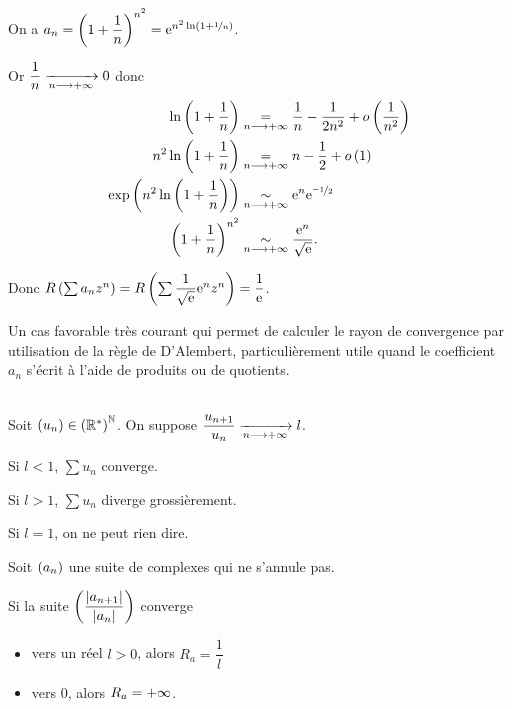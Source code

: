 \begin{corr}~\\
On a \(a_n=\left(1+\dfrac{1}{n}\right)^{n^2}=\mathrm{e}^{n^2\ln\left(1+\nicefrac{1}{n}\right)}\).

Or \(\dfrac{1}{n}\xrightarrow[n\longrightarrow+\infty]{}0\) donc \[\begin{aligned}
\ln\left(1+\dfrac{1}{n}\right)&\underset{n\longrightarrow+\infty}{=}\dfrac{1}{n}-\dfrac{1}{2n^2}+o\left(\dfrac{1}{n^2}\right) \\
n^2\ln\left(1+\dfrac{1}{n}\right)&\underset{n\longrightarrow+\infty}{=}n-\dfrac{1}{2}+o\left(1\right) \\
\exp\left(n^2\ln\left(1+\dfrac{1}{n}\right)\right)&\underset{n\longrightarrow+\infty}{\sim}\mathrm{e}^{n}\mathrm{e}^{\nicefrac{-1}{2}} \\
\left(1+\dfrac{1}{n}\right)^{n^2}&\underset{n\longrightarrow+\infty}{\sim}\dfrac{\mathrm{e}^{n}}{\sqrt{\mathrm{e}^{}}}.
\end{aligned}\]

Donc \(R\left(\sum a_nz^n\right)=R\left(\sum\dfrac{1}{\sqrt{\mathrm{e}^{}}}\mathrm{e}^{n}z^n\right)=\dfrac{1}{\mathrm{e}^{}}\).
\end{corr}

Un cas favorable très courant qui permet de calculer le rayon de convergence par utilisation de la règle de D'Alembert, particulièrement utile quand le coefficient \(a_n\) s'écrit à l'aide de produits ou de quotients.

\begin{rappel}~\\
Soit \(\left(u_n\right)\in\left(\mathbb{R}^*\right)^{\mathbb{N}}\). On suppose \(\dfrac{u_{n+1}}{u_n}\xrightarrow[n\longrightarrow+\infty]{}l\).

Si \(l<1\), \(\sum u_n\) converge.

Si \(l>1\), \(\sum u_n\) diverge grossièrement.

Si \(l=1\), on ne peut rien dire.
\end{rappel}

\begin{prop}
Soit \(\left(a_n\right)\) une suite de complexes qui ne s'annule pas.

Si la suite \(\left(\dfrac{\left\lvert a_{n+1}\right\rvert}{\left\lvert a_n\right\rvert}\right)\) converge

\begin{itemize}
    \item vers un réel \(l>0\), alors \(R_a=\dfrac{1}{l}\) \\
    \item vers \(0\), alors \(R_a=+\infty\).
\end{itemize}
\end{prop}

